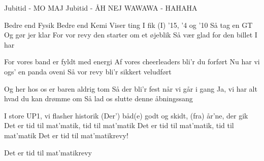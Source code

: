 \documentclass[a4paper,11pt]{article}
\begin{document}
\begin{song}
 Jubitid - MO MAJ
Jubitid - ÅH NEJ
WAWAWA - HAHAHA

 Bedre end Fysik
Bedre end Kemi
Viser ting I fik
(I) '15, '4 og '10
Så tag en GT
Og gør jer klar
For vor revy den starter om et øjeblik
Så vær glad for den billet I har

 For vores band er fyldt med energi
Af vores cheerleaders bli'r du forført
Nu har vi ogs' en panda oveni
Så vor revy bli'r sikkert veludført

 Og her hos os er baren aldrig tom
Så der bli'r fest når vi går i gang
Ja, vi har alt hvad du kan drømme om
Så lad os slutte denne åbningssang

 I store UP1, vi flasher historik
(Der') båd(e) godt og skidt, (fra) år'ne, der gik
Det er tid til mat'matik, tid til mat'matik
Det er tid til mat'matik, tid til mat'matik
Det er tid til mat'matikrevy!

 Det er tid til mat'matikrevy
\end{song}
\end{document}
